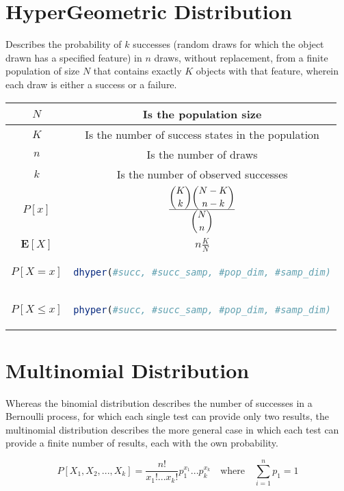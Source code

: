 \section{HyperGeometric Distribution}
\begin{tcolorbox}
Describes the probability of \(k\) successes (random draws for which the object drawn has a specified feature) in \(n\) draws, without replacement, from a finite population of size \(N\) that contains exactly \(K\) objects with that feature, wherein each draw is either a success or a failure.
\end{tcolorbox}
\begingroup
\setlength{\tabcolsep}{10pt} %
\renewcommand{\arraystretch}{1.5} %
\begin{center}
\begin{tabular}{ |c|c| } 
\hline
\(N\) & Is the population size \\ \hline
\(K\) & Is the number of success states in the population \\ \hline
\(n\) & Is the number of draws  \\ \hline
\(k\) & Is the number of observed successes \\ \hline
\(P[x]\) & \(\frac{\dbinom{K}{k}\dbinom{N-K}{n-k}}{\dbinom{N}{n}}\)\\ \hline
\(\mathbf{E}[X]\) & \(n\frac{K}{N}\) \\ \hline\hline
\(P[X = x]\) & \begin{lstlisting}[language=R]
dhyper(#succ, #succ_samp, #pop_dim, #samp_dim)
\end{lstlisting} \\ \hline
\(P[X \leq x]\) & \begin{lstlisting}[language=R]
phyper(#succ, #succ_samp, #pop_dim, #samp_dim)
\end{lstlisting} \\ \hline
\end{tabular}
\end{center}
\endgroup



\section{Multinomial Distribution}
\begin{tcolorbox}
Whereas the binomial distribution describes the number of successes in a Bernoulli process, for which each single test can provide only two results, the multinomial distribution describes the more general case in which each test can provide a finite number of results, each with the own probability.
\end{tcolorbox}
\[P[X_1, X_2,...,X_k] = \frac{n!}{x_1!...x_k!}p_1^{x_1}...p_k^{x_k} \quad \text{where} \quad \sum_{i = 1}^n p_1 = 1\]


